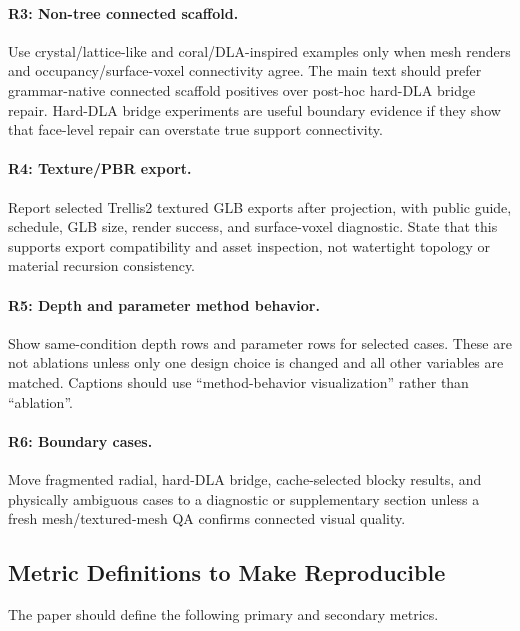 \paragraph{R3: Non-tree connected scaffold.}
Use crystal/lattice-like and coral/DLA-inspired examples only when mesh renders
and occupancy/surface-voxel connectivity agree. The main text should prefer
grammar-native connected scaffold positives over post-hoc hard-DLA bridge
repair. Hard-DLA bridge experiments are useful boundary evidence if they show
that face-level repair can overstate true support connectivity.

\paragraph{R4: Texture/PBR export.}
Report selected Trellis2 textured GLB exports after projection, with public
guide, schedule, GLB size, render success, and surface-voxel diagnostic. State
that this supports export compatibility and asset inspection, not watertight
topology or material recursion consistency.

\paragraph{R5: Depth and parameter method behavior.}
Show same-condition depth rows and parameter rows for selected cases. These are
not ablations unless only one design choice is changed and all other variables
are matched. Captions should use ``method-behavior visualization'' rather than
``ablation''.

\paragraph{R6: Boundary cases.}
Move fragmented radial, hard-DLA bridge, cache-selected blocky results, and
physically ambiguous cases to a diagnostic or supplementary section unless a
fresh mesh/textured-mesh QA confirms connected visual quality.

\subsection{Metric Definitions to Make Reproducible}

The paper should define the following primary and secondary metrics.


